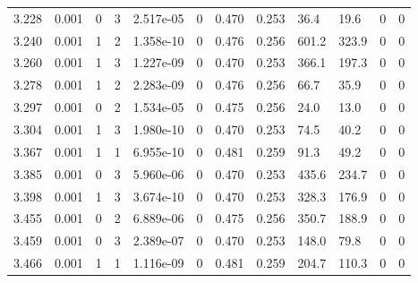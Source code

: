 \documentclass[preview]{standalone}
\begin{document}
{{{{\begin{tabular}{L{1.2cm}C{1.2cm} C{0.3cm}C{0.5cm} C{1.4cm}C{1.4cm} C{1.4cm}C{1.4cm} C{1.6cm}C{1.6cm} C{1.6cm}C{1.6cm}}
  3.228  &  0.001  & 0     &  3 &  2.517e-05  & 0  &  0.470&   0.253& 36.4 & 19.6   &  0 & 0  \\ 
  3.240  &  0.001  & 1     &  2 &  1.358e-10  & 0  &  0.476&   0.256& 601.2 & 323.9   &  0 & 0  \\ 
  3.260  &  0.001  & 1     &  3 &  1.227e-09  & 0  &  0.470&   0.253& 366.1 & 197.3   &  0 & 0  \\ 
  3.278  &  0.001  & 1     &  2 &  2.283e-09  & 0  &  0.476&   0.256& 66.7 & 35.9   &  0 & 0  \\ 
  3.297  &  0.001  & 0     &  2 &  1.534e-05  & 0  &  0.475&   0.256& 24.0 & 13.0   &  0 & 0  \\ 
  3.304  &  0.001  & 1     &  3 &  1.980e-10  & 0  &  0.470&   0.253& 74.5 & 40.2   &  0 & 0  \\ 
  3.367  &  0.001  & 1     &  1 &  6.955e-10  & 0  &  0.481&   0.259& 91.3 & 49.2   &  0 & 0  \\ 
  3.385  &  0.001  & 0     &  3 &  5.960e-06  & 0  &  0.470&   0.253& 435.6 & 234.7   &  0 & 0  \\ 
  3.398  &  0.001  & 1     &  3 &  3.674e-10  & 0  &  0.470&   0.253& 328.3 & 176.9   &  0 & 0  \\ 
  3.455  &  0.001  & 0     &  2 &  6.889e-06  & 0  &  0.475&   0.256& 350.7 & 188.9   &  0 & 0  \\ 
  3.459  &  0.001  & 0     &  3 &  2.389e-07  & 0  &  0.470&   0.253& 148.0 & 79.8   &  0 & 0  \\ 
  3.466  &  0.001  & 1     &  1 &  1.116e-09  & 0  &  0.481&   0.259& 204.7 & 110.3   &  0 & 0  \\ 
\hline 
\end{tabular} 

}}}}
\end{document}
